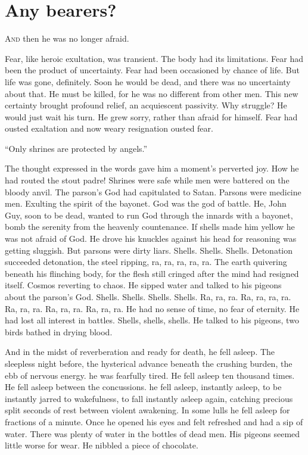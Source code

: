 \chapter*{\textsf{Any bearers?}}

A\textsc{nd} then he was no longer afraid.

Fear, like heroic exultation, was transient. The body had its limitations. Fear had been the product of uncertainty. Fear had been occasioned by chance of life. But life was gone, definitely. Soon he would be dead, and there was no uncertainty about that. He must be killed, for he was no different from other men. This new certainty brought profound relief, an acquiescent passivity. Why struggle? He would just wait his turn. He grew sorry, rather than afraid for himself. Fear had ousted exaltation and now weary resignation ousted fear.

``Only shrines are protected by angels.''

The thought expressed in the words gave him a moment's perverted joy. How he had routed the stout padre! Shrines were safe while men were battered on the bloody anvil. The parson's God had capitulated to Satan. Parsons were medicine men. Exulting the spirit of the bayonet. God was the god of battle. He, John Guy, soon to be dead, wanted to run God through the innards with a bayonet, bomb the serenity from the heavenly countenance. If shells made him yellow he was not afraid of God. He drove his knuckles against his head for reasoning was getting sluggish. But parsons were dirty liars. Shells. Shells. Shells. Detonation succeeded detonation, the steel ripping, ra, ra, ra, ra, ra. The earth quivering beneath his flinching body, for the flesh still cringed after the mind had resigned itself. Cosmos reverting to chaos. He sipped water and talked to his pigeons about the parson's God. Shells. Shells. Shells. Shells. Ra, ra, ra. Ra, ra, ra, ra. Ra, ra, ra. Ra, ra, ra. Ra, ra, ra. He had no sense of time, no fear of eternity. He had lost all interest in battles. Shells, shells, shells. He talked to his pigeons, two birds bathed in drying blood.

And in the midst of reverberation and ready for death, he fell asleep. The sleepless night before, the hysterical advance beneath the crushing burden, the ebb of nervous energy. he was fearfully tired. He fell asleep ten thousand times. He fell asleep between the concussions. he fell asleep, instantly asleep, to be instantly jarred to wakefulness, to fall instantly asleep again, catching precious split seconds of rest between violent awakening. In some lulls he fell asleep for fractions of a minute. Once he opened his eyes and felt refreshed and had a sip of water. There was plenty of water in the bottles of dead men. His pigeons seemed little worse for wear. He nibbled a piece of chocolate.

